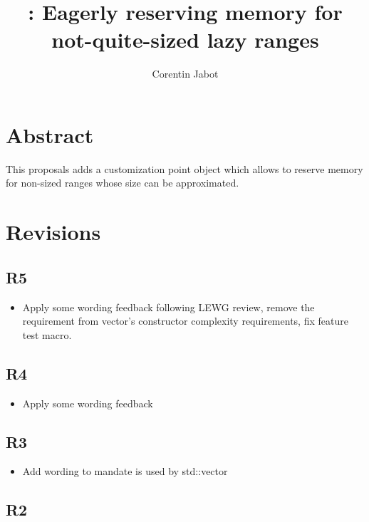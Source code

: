 \documentclass{wg21}
\title{\tcode{reserve\_hint}: Eagerly reserving memory for not-quite-sized lazy ranges}
\author{Corentin Jabot}{corentin.jabot@gmail.com}
\begin{document}
\maketitle

\section{Abstract}

This proposals adds a  customization point object which allows  to
reserve memory for non-sized ranges whose size can be approximated.

\section{Revisions}

\subsection{R5}

\begin{itemize}
\item Apply some wording feedback following LEWG review, remove the 
      requirement from vector's constructor complexity requirements, fix feature test macro.
\end{itemize}

\subsection{R4}

\begin{itemize}
\item Apply some wording feedback
\end{itemize}


\subsection{R3}

\begin{itemize}
\item Add wording to mandate  is used by std::vector
\end{itemize}

\subsection{R2}
\end{document}
